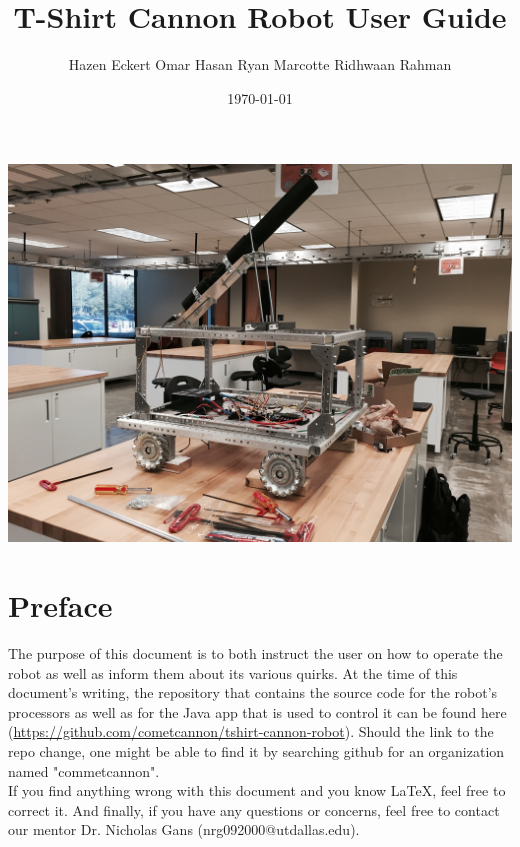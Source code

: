 \documentclass[letterpaper,12pt]{article}
\begin{document}
\title{\textbf{T-Shirt Cannon Robot User Guide}}
\author{Hazen Eckert \hspace{3mm} Omar Hasan \hspace{3mm} Ryan Marcotte \hspace{3mm} Ridhwaan Rahman}
\date{\today}
\maketitle

\begin{center}
    \includegraphics[width=15cm]{./pics/chassis/robot.jpg}
\end{center}

\pagebreak

\section*{Preface}
The purpose of this document is to both instruct the user on how to operate the
robot as well as inform them about its various quirks. At the time of this
document's writing, the repository that contains the source code for the
robot's processors as well as for the Java app that is used to control it
can be found here (\url{https://github.com/cometcannon/tshirt-cannon-robot}).
Should the link to the repo change, one might be able to find it by searching
github for an organization named "commetcannon".\\

If you find anything wrong with this document and you know LaTeX, feel free to
correct it. And finally, if you have any questions or concerns, feel free to
contact our mentor Dr. Nicholas Gans (nrg092000@utdallas.edu).\\
\end{document}
